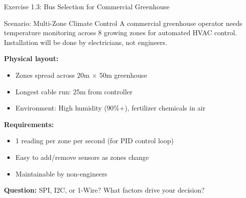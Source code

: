 \documentclass[aspectratio=169,11pt]{beamer}
\begin{document}
\begin{frame}{Exercise 1.3: Bus Selection for Commercial Greenhouse}
    \begin{block}{Scenario: Multi-Zone Climate Control}
        A commercial greenhouse operator needs temperature monitoring across 8 growing zones for automated HVAC control. Installation will be done by electricians, not engineers.
        
        \vspace{0.2cm}
        \textbf{Physical layout:}
        \begin{itemize}
            \item Zones spread across 20m $\times$ 50m greenhouse
            \item Longest cable run: 25m from controller
            \item Environment: High humidity (90\%+), fertilizer chemicals in air
        \end{itemize}
        
        \vspace{0.2cm}
        \textbf{Requirements:}
        \begin{itemize}
            \item 1 reading per zone per second (for PID control loop)
            \item Easy to add/remove sensors as zones change
            \item Maintainable by non-engineers
        \end{itemize}
    \end{block}
    
    \textbf{Question:} SPI, I2C, or 1-Wire? What factors drive your decision?
\end{frame}
\end{document}
